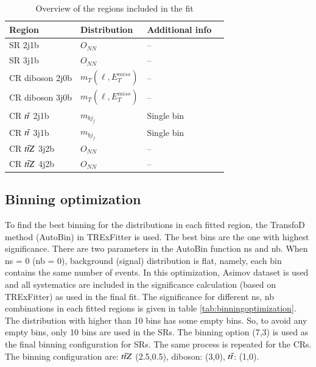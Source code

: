 \begin{table}[h!]
     \centering
      \begin{tabular}{@{} *4l  @{}}
      \toprule
       Region & Distribution & Additional info \\
     \midrule
      SR 2j1b & $O_{NN}$ & {--}\\[0.2ex]
      SR 3j1b & $O_{NN}$ & {--}\\[0.2ex]
      CR diboson 2j0b & $m_{T}(\ell,E_{T}^{miss})$ & {--}\\[0.2ex]
      CR diboson 3j0b & $m_{T}(\ell,E_{T}^{miss})$ & {--}\\[0.2ex]
      CR $t\Bar{t}$ 2j1b & $m_{bj_{f}}$ & Single bin \\[0.2ex]
      CR $t\Bar{t}$ 3j1b & $m_{bj_{f}}$ & Single bin \\[0.2ex]
      CR $t\Bar{t}Z$ 3j2b & $O_{NN}$ & {--}\\[0.2ex]
      CR $t\Bar{t}Z$ 4j2b & $O_{NN}$ & {--}\\[0.2ex]
      \bottomrule
 \end{tabular}
 \caption{Overview of the regions included in the fit}
 \label{tab:fittedregions}
 \end{table}


\subsection{Binning optimization}
\label{subsec:binningoptimization}

To find the best binning for the distributions in each fitted region, the TransfoD method (AutoBin) in TRExFitter is used. The best bins are the one with highest significance. There are two parameters in the AutoBin function ns and nb. When ns = 0 (nb = 0), background (signal) distribution is flat, namely, each bin contains the same number of events. In this optimization, Asimov dataset is used and all systematics are included in the significance calculation (based on TRExFitter) as used in the final fit. The significance for different ns, nb combinations in each fitted regions is given in table \ref{tab:binningoptimization}. The distribution with higher than 10 bins has some empty bins. So, to avoid any empty bins, only 10 bins are used in the SRs. The binning option (7,3) is used as the final binning configuration for SRs. The same process is repeated for the CRs. The binning configuration are: $t\Bar{t}Z$ (2.5,0.5), diboson: (3,0), $t\Bar{t}$: (1,0).

